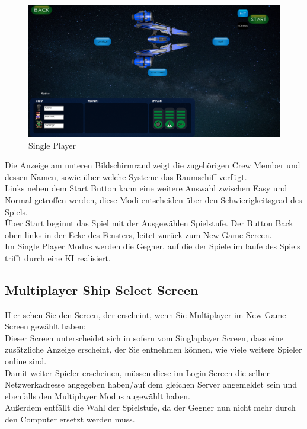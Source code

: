 \documentclass[fontsize=12pt,paper=a4,twoside]{scrartcl}
\begin{document}
\begin{figure}[htp]
	\centering
	\includegraphics[width=1.00\linewidth]{pics/SinglePlayer01.png}
	\caption{Single Player}
\end{figure}

Die Anzeige am unteren Bildschirmrand zeigt die zugehörigen Crew Member und dessen Namen, sowie über welche Systeme das Raumschiff verfügt.\\
Links neben dem Start Button kann eine weitere Auswahl zwischen Easy und Normal getroffen werden, diese Modi entscheiden über den Schwierigkeitsgrad des Spiels.\\
Über Start beginnt das Spiel mit der Ausgewählen Spielstufe.
Der Button Back oben links in der Ecke des Fensters, leitet zurück zum New Game Screen.\\
Im Single Player Modus werden die Gegner, auf die der Spiele im laufe des Spiels trifft durch eine KI realisiert.

\newpage
\subsection{Multiplayer Ship Select Screen}

Hier sehen Sie den Screen, der erscheint, wenn Sie  Multiplayer im New Game Screen gewählt haben:\\
Dieser Screen unterscheidet sich in sofern vom Singlaplayer Screen, dass eine zusätzliche Anzeige erscheint, der Sie entnehmen können, wie viele weitere Spieler online sind.\\
Damit weiter Spieler erscheinen, müssen diese im Login Screen die selber Netzwerkadresse angegeben haben/auf dem gleichen Server angemeldet sein und ebenfalls den Multiplayer Modus augewählt haben.\\
Außerdem entfällt die Wahl der Spielstufe, da der Gegner nun nicht mehr durch den Computer ersetzt werden muss.
\end{document}
